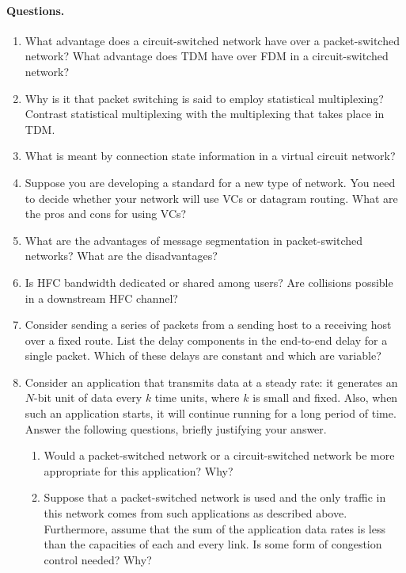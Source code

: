 
\paragraph{Questions.}

\begin{enumerate}

  \item What advantage does a circuit-switched network have over a
    packet-switched network? What advantage does TDM have over FDM in
    a circuit-switched network?

  \item Why is it that packet switching is said to employ statistical
    multiplexing? Contrast statistical multiplexing with the
    multiplexing that takes place in TDM.

  \item What is meant by connection state information in a virtual
    circuit network?

  \item Suppose you are developing a standard for a new type of
    network. You need to decide whether your network will use VCs or
    datagram routing. What are the pros and cons for using VCs?

  \item What are the advantages of message segmentation in
    packet-switched networks? What are the disadvantages?

  \item Is HFC bandwidth dedicated or shared among users? Are
    collisions possible in a downstream HFC channel?

  \item Consider sending a series of packets from a sending host
    to a receiving host over a fixed route. List the delay components
    in the end-to-end delay for a single packet. Which of these delays
    are constant and which are variable?

  \item Consider an application that transmits data at a steady rate:
    it generates an \(N\)-bit unit of data every \(k\) time units,
    where \(k\) is small and fixed. Also, when such an application
    starts, it will continue running for a long period of time. Answer
    the following questions, briefly justifying your answer.

    \begin{enumerate}
 
      \item Would a packet-switched network or a circuit-switched
        network be more appropriate for this application? Why?

      \item Suppose that a packet-switched network is used and the
        only traffic in this network comes from such applications as
        described above. Furthermore, assume that the sum of the
        application data rates is less than the capacities of each and
        every link. Is some form of congestion control needed? Why?

    \end{enumerate}

\end{enumerate}

